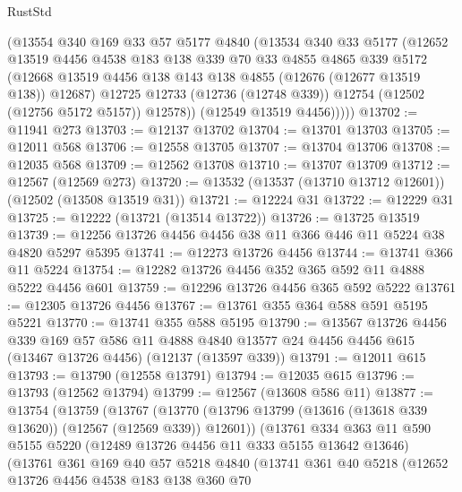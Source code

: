 \begin{lexlean}{RustStd}
\begin{coremodule}
          (@13554
            @340
            @169
            @33
            @57
            @5177
            @4840
            (@13534
              @340
              @33
              @5177
              (@12652
                @13519
                @4456
                @4538
                @183
                @138
                @339
                @70
                @33
                @4855
                @4865
                @339
                @5172
                (@12668 @13519 @4456 @138 @143 @138 @4855 (@12676 (@12677 @13519 @138)) @12687)
                @12725
                @12733
                (@12736 (@12748 @339))
                @12754
                (@12502 (@12756 @5172 @5157))
                @12578))
            (@12549 @13519 @4456)))))
@13702 := @11941 @273
@13703 := @12137 @13702
@13704 := @13701 @13703
@13705 := @12011 @568
@13706 := @12558 @13705
@13707 := @13704 @13706
@13708 := @12035 @568
@13709 := @12562 @13708
@13710 := @13707 @13709
@13712 := @12567 (@12569 @273)
@13720 := @13532 (@13537 (@13710 @13712 @12601)) (@12502 (@13508 @13519 @31))
@13721 := @12224 @31
@13722 := @12229 @31
@13725 := @12222 (@13721 (@13514 @13722))
@13726 := @13725 @13519
@13739 := @12256 @13726 @4456 @4456 @38 @11 @366 @446 @11 @5224 @38 @4820 @5297 @5395
@13741 := @12273 @13726 @4456
@13744 := @13741 @366 @11 @5224
@13754 := @12282 @13726 @4456 @352 @365 @592 @11 @4888 @5222 @4456 @601
@13759 := @12296 @13726 @4456 @365 @592 @5222
@13761 := @12305 @13726 @4456
@13767 := @13761 @355 @364 @588 @591 @5195 @5221
@13770 := @13741 @355 @588 @5195
@13790 := @13567
    @13726
    @4456
    @339
    @169
    @57
    @586
    @11
    @4888
    @4840
    @13577
    @24
    @4456
    @4456
    @615
    (@13467 @13726 @4456)
    (@12137 (@13597 @339))
@13791 := @12011 @615
@13793 := @13790 (@12558 @13791)
@13794 := @12035 @615
@13796 := @13793 (@12562 @13794)
@13799 := @12567 (@13608 @586 @11)
@13877 := @13754
    (@13759
      (@13767
        (@13770 (@13796 @13799 (@13616 (@13618 @339 @13620)) (@12567 (@12569 @339)) @12601))
        (@13761
          @334
          @363
          @11
          @590
          @5155
          @5220
          (@12489 @13726 @4456 @11 @333 @5155 @13642 @13646)
          (@13761
            @361
            @169
            @40
            @57
            @5218
            @4840
            (@13741
              @361
              @40
              @5218
              (@12652
                @13726
                @4456
                @4538
                @183
                @138
                @360
                @70

\end{coremodule}
\end{lexlean}

